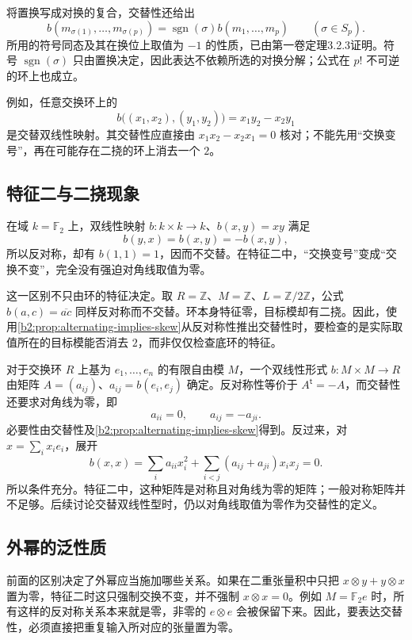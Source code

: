 将置换写成对换的复合，交替性还给出
\begin{equation}\label{b2:eq:alternating-permutation}
	b(m_{\sigma(1)},\ldots,m_{\sigma(p)}) =\operatorname{sgn}(\sigma)b(m_1,\ldots,m_p) \qquad(\sigma\in S_p).
\end{equation}
所用的符号同态及其在换位上取值为 \(-1\) 的性质，已由第一卷定理3.2.3证明。符号 \(\operatorname{sgn}(\sigma)\) 只由置换决定，因此表达不依赖所选的对换分解；公式在 \(p!\) 不可逆的环上也成立。

\ProseParagraphBreak
例如，任意交换环上的
\[
	b\bigl((x_1,x_2),(y_1,y_2)\bigr)=x_1y_2-x_2y_1
\]
是交替双线性映射。其交替性应直接由 \(x_1x_2-x_2x_1=0\) 核对；不能先用“交换变号”，再在可能存在二挠的环上消去一个 \(2\)。

\subsection{特征二与二挠现象}
\label{b2:subsec:0901:02}

在域 \(k=\mathbb F_2\) 上，双线性映射 \(b:k\times k\to k\)、\(b(x,y)=xy\) 满足
\[
	b(y,x)=b(x,y)=-b(x,y),
\]
所以反对称，却有 \(b(1,1)=1\)，因而不交替。在特征二中，“交换变号”变成“交换不变”，完全没有强迫对角线取值为零。

\ProseParagraphBreak
这一区别不只由环的特征决定。取 \(R=\mathbb Z\)、\(M=\mathbb Z\)、\(L=\mathbb Z/2\mathbb Z\)，公式 \(b(a,c)=\overline{ac}\) 同样反对称而不交替。环本身特征零，目标模却有二挠。因此，使用\cref{b2:prop:alternating-implies-skew}从反对称性推出交替性时，要检查的是实际取值所在的目标模能否消去 \(2\)，而非仅仅检查底环的特征。

\ProseParagraphBreak
对于交换环 \(R\) 上基为 \(e_1,\ldots,e_n\) 的有限自由模 \(M\)，一个双线性形式 \(b:M\times M\rightarrow R\) 由矩阵 \(A=(a_{ij})\)、\(a_{ij}=b(e_i,e_j)\) 确定。反对称性等价于 \(A^{\mathsf t}=-A\)，而交替性还要求对角线为零，即
\[
	a_{ii}=0,\qquad a_{ij}=-a_{ji}.
\]
必要性由交替性及\cref{b2:prop:alternating-implies-skew}得到。反过来，对 \(x=\sum_i x_ie_i\)，展开
\[
	b(x,x)=\sum_i a_{ii}x_i^2+ \sum_{i<j}(a_{ij}+a_{ji})x_ix_j=0.
\]
所以条件充分。特征二中，这种矩阵是对称且对角线为零的矩阵；一般对称矩阵并不足够。后续讨论交替双线性型时，仍以对角线取值为零作为交替性的定义。

\subsection{外幂的泛性质}
\label{b2:subsec:0901:03}

前面的区别决定了外幂应当施加哪些关系。如果在二重张量积中只把 \(x\otimes y+y\otimes x\) 置为零，特征二时这只强制交换不变，并不强制 \(x\otimes x=0\)。例如 \(M=\mathbb F_2 e\) 时，所有这样的反对称关系本来就是零，非零的 \(e\otimes e\) 会被保留下来。因此，要表达交替性，必须直接把重复输入所对应的张量置为零。

